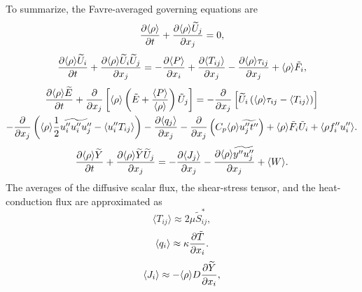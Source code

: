 \documentclass[oneside,a4paper,11pt]{report}
\begin{document}
To summarize, the Favre-averaged governing equations are
\begin{equation}
\label{eq:favre_rho}
\frac{\partial \langle \rho \rangle}{\partial t} + \frac{\partial \langle \rho \rangle \widetilde{U}_j}{\partial x_j} = 0,
\end{equation}
\begin{equation}
\label{eq:favre_vel}
\frac{\partial \langle \rho \rangle \widetilde{U}_i}{\partial t} + \frac{\partial \langle \rho \rangle \widetilde{U}_i \widetilde{U}_j}{\partial x_j} = -\frac{\partial \langle P \rangle}{\partial x_i} + \frac{\partial \langle T_{ij} \rangle }{\partial x_j} - \frac{\partial \langle \rho \rangle \tau_{ij} }{\partial x_j} + \langle \rho \rangle \tilde{F}_i,
\end{equation}
\begin{multline}
\label{eq:favre_energy}
\frac{\partial \langle \rho \rangle \widetilde{E}}{\partial t} + \frac{\partial}{\partial x_j} \left [ \langle \rho \rangle \left ( \tilde{E} + \frac{ \langle P \rangle}{ \langle \rho \rangle} \right ) \tilde{U}_j \right ] = - \frac{\partial}{\partial x_j} \left [ \widetilde{U}_i \left ( \langle \rho \rangle \tau_{ij} - \langle T_{ij} \rangle \right ) \right ] \\
- \frac{ \partial }{\partial x_j} \left ( \langle \rho \rangle \frac{1}{2} \widetilde{ u_i'' u_i'' u_j'' } - \langle u_i'' T_{ij} \rangle \right ) - \frac{\partial \langle q_j \rangle}{\partial x_j} - \frac{\partial}{\partial x_j} \left ( C_p \langle \rho \rangle \widetilde{ u_j'' t'' } \right ) + \langle \rho \rangle \tilde{F}_i \tilde{U}_i + \langle \rho f_i'' u_i'' \rangle.
\end{multline}
\begin{equation}
    \label{eq:favre_scalar}
    \frac{\partial \langle \rho \rangle \widetilde{Y}}{\partial t} + \frac{\partial \langle \rho \rangle \widetilde{Y} \widetilde{U}_j}{\partial x_j} = -\frac{\partial \langle J_j \rangle}{\partial x_j} - \frac{\partial \langle \rho \rangle \widetilde{y'' u_j''}}{\partial x_j} + \langle W \rangle.    
\end{equation}
The averages of the diffusive scalar flux, the shear-stress tensor, and the heat-conduction flux are approximated as
\begin{equation}
    \label{eq:shear_stress_model}
    \langle T_{ij} \rangle \approx 2 \mu \tilde{S}^*_{ij},
\end{equation}
\begin{equation}
    \left < q_i \right > \approx \kappa \frac{ \partial \tilde{T} }{ \partial x_i }.
\end{equation}
\begin{equation}
    \langle J_i \rangle \approx - \langle \rho \rangle D \frac{\partial \widetilde{Y}}{\partial x_i},
\end{equation}
\end{document}
